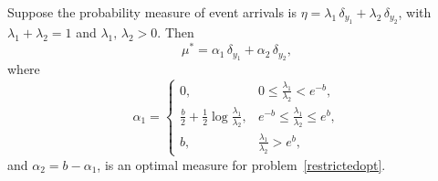 \documentclass[stsy,sglanonrev]{informs4}
\begin{document}
\begin{theorem}\label{thm:opt2dem}
    Suppose the probability measure of event arrivals is \(\eta = \lambda_1\,\delta_{y_1} + \lambda_2\,\delta_{y_2}\), with \(\lambda_1 + \lambda_2 = 1\) and \(\lambda_1, \, \lambda_2 > 0\). Then
\begin{equation}\label{opt2Dem}
    \mu^* = \alpha_1 \, \delta_{y_1} + \alpha_2 \, \delta_{y_2},
\end{equation}
where
\[
\alpha_1 =
\begin{cases}
0, & 0 \leq \frac{\lambda_1}{\lambda_2} < e^{-b}, \\
\frac{b}{2} + \frac{1}{2} \log \frac{\lambda_1}{\lambda_2}, & e^{-b} \leq \frac{\lambda_1}{\lambda_2} \leq e^b, \\
b, & \frac{\lambda_1}{\lambda_2} > e^b,
\end{cases}
\]
and \(\alpha_2 = b - \alpha_1\), is an optimal measure for problem~\eqref{restrictedopt}.
\end{theorem}
\end{document}
